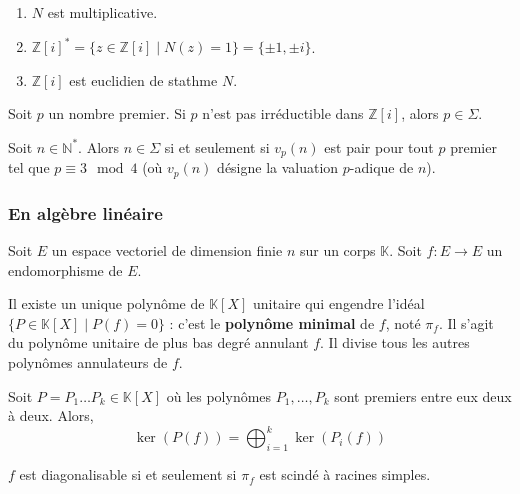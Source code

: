   \begin{lemma}
    \begin{enumerate}[label={\bfseries(\roman*)}]
      \item $N$ est multiplicative.
      \item $\mathbb{Z}[i]^* = \{ z \in \mathbb{Z}[i] \mid N(z) = 1 \} = \{ \pm 1, \pm i \}$.
      \item $\mathbb{Z}[i]$ est euclidien de stathme $N$.
    \end{enumerate}
  \end{lemma}

  \begin{lemma}
    Soit $p$ un nombre premier. Si $p$ n'est pas irréductible dans $\mathbb{Z}[i]$, alors $p \in \Sigma$.
  \end{lemma}


  \begin{theorem}
    Soit $n \in \mathbb{N}^*$. Alors $n \in \Sigma$ si et seulement si $v_p(n)$ est pair pour tout $p$ premier tel que $p \equiv 3 \mod 4$ (où $v_p(n)$ désigne la valuation $p$-adique de $n$).
  \end{theorem}

  \subsubsection{En algèbre linéaire}

  Soit $E$ un espace vectoriel de dimension finie $n$ sur un corps $\mathbb{K}$. Soit $f : E \rightarrow E$ un endomorphisme de $E$.


  \begin{application}
    Il existe un unique polynôme de $\mathbb{K}[X]$ unitaire qui engendre l'idéal $\{ P \in \mathbb{K}[X] \mid P(f) = 0 \}$ : c'est le \textbf{polynôme minimal} de $f$, noté $\pi_f$. Il s'agit du polynôme unitaire de plus bas degré annulant $f$. Il divise tous les autres polynômes annulateurs de $f$.
  \end{application}

  \begin{theorem}
    Soit $P = P_1 \dots P_k \in \mathbb{K}[X]$ où les polynômes $P_1, \dots, P_k$ sont premiers entre eux deux à deux. Alors,
    \[ \ker(P(f)) = \bigoplus_{i=1}^k \ker(P_i(f)) \]
  \end{theorem}

  \begin{application}
    $f$ est diagonalisable si et seulement si $\pi_f$ est scindé à racines simples.
  \end{application}

